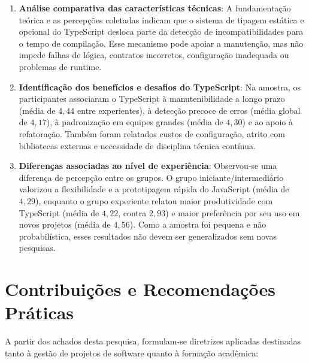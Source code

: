 \begin{enumerate}
    \item \textbf{Análise comparativa das características técnicas}: A fundamentação teórica e as percepções coletadas indicam que o sistema de tipagem estática e opcional do TypeScript desloca parte da detecção de incompatibilidades para o tempo de compilação. Esse mecanismo pode apoiar a manutenção, mas não impede falhas de lógica, contratos incorretos, configuração inadequada ou problemas de runtime.
    
    \item \textbf{Identificação dos benefícios e desafios do TypeScript}: Na amostra, os participantes associaram o TypeScript à manutenibilidade a longo prazo (média de $4,44$ entre experientes), à detecção precoce de erros (média global de $4,17$), à padronização em equipes grandes (média de $4,30$) e ao apoio à refatoração. Também foram relatados custos de configuração, atrito com bibliotecas externas e necessidade de disciplina técnica contínua.
    
    \item \textbf{Diferenças associadas ao nível de experiência}: Observou-se uma diferença de percepção entre os grupos. O grupo iniciante/intermediário valorizou a flexibilidade e a prototipagem rápida do JavaScript (média de $4,29$), enquanto o grupo experiente relatou maior produtividade com TypeScript (média de $4,22$, contra $2,93$) e maior preferência por seu uso em novos projetos (média de $4,56$). Como a amostra foi pequena e não probabilística, esses resultados não devem ser generalizados sem novas pesquisas.
\end{enumerate}

\section{Contribuições e Recomendações Práticas}
\label{sec:recomendacoes_praticas}

A partir dos achados desta pesquisa, formulam-se diretrizes aplicadas destinadas tanto à gestão de projetos de software quanto à formação acadêmica:

